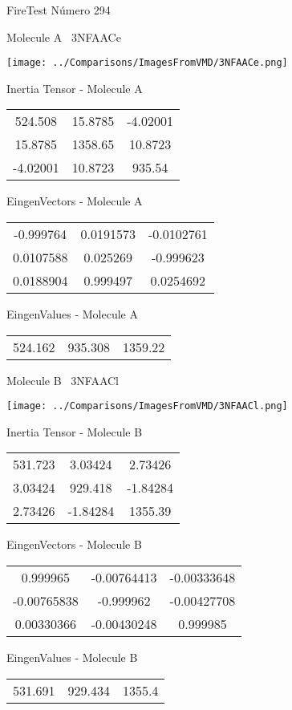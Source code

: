 \vtab[-3cm]
\begin{center}
{\large FireTest \tab Número 294}
\end{center}
\begin{multicols}{2}
\begin{center}

Molecule A \
3NFAACe

\texttt{[image: ../Comparisons/ImagesFromVMD/3NFAACe.png]}

Inertia Tensor - Molecule A \\
\begin{tabular}{|c c c|}
524.508	 & 	15.8785	 & 	-4.02001	 \\
15.8785	 & 	1358.65	 & 	10.8723	 \\
-4.02001	 & 	10.8723	 & 	935.54
\end{tabular}

\vtab
 EingenVectors - Molecule A     \\
\begin{tabular}{|c c c|}
-0.999764	 & 	0.0191573	 & 	-0.0102761	 \\
0.0107588	 & 	0.025269	 & 	-0.999623	 \\
0.0188904	 & 	0.999497	 & 	0.0254692
\end{tabular}

\vtab
 EingenValues - Molecule A     \\
\begin{tabular}{|c c c|}
524.162	 & 	935.308	 & 	1359.22	 \\
\end{tabular}
\columnbreak

Molecule B \
3NFAACl

\texttt{[image: ../Comparisons/ImagesFromVMD/3NFAACl.png]}

Inertia Tensor - Molecule B \\
\begin{tabular}{|c c c|}
531.723	 & 	3.03424	 & 	2.73426	 \\
3.03424	 & 	929.418	 & 	-1.84284	 \\
2.73426	 & 	-1.84284	 & 	1355.39
\end{tabular}

\vtab
 EingenVectors - Molecule B     \\
\begin{tabular}{|c c c|}
0.999965	 & 	-0.00764413	 & 	-0.00333648	 \\
-0.00765838	 & 	-0.999962	 & 	-0.00427708	 \\
0.00330366	 & 	-0.00430248	 & 	0.999985
\end{tabular}

\vtab
 EingenValues - Molecule B     \\
\begin{tabular}{|c c c|}
531.691	 & 	929.434	 & 	1355.4	 \\
\end{tabular}

\end{center}
\end{multicols}

